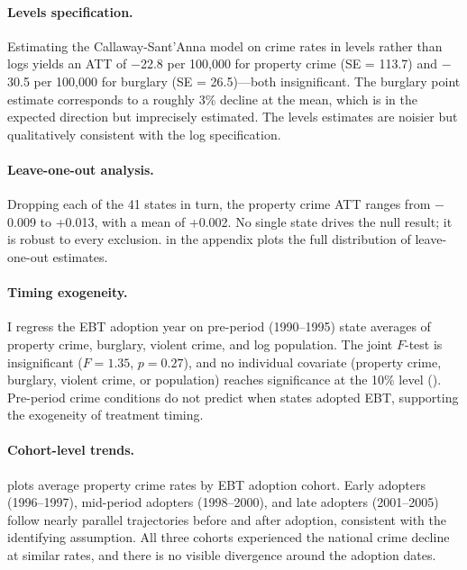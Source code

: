 \documentclass[12pt]{article}
\begin{document}
\paragraph{Levels specification.} Estimating the Callaway-Sant'Anna model on crime rates in levels rather than logs yields an ATT of $-$22.8 per 100,000 for property crime (SE = 113.7) and $-$30.5 per 100,000 for burglary (SE = 26.5)---both insignificant. The burglary point estimate corresponds to a roughly 3\% decline at the mean, which is in the expected direction but imprecisely estimated. The levels estimates are noisier but qualitatively consistent with the log specification.

\paragraph{Leave-one-out analysis.} Dropping each of the 41 states in turn, the property crime ATT ranges from $-$0.009 to +0.013, with a mean of +0.002. No single state drives the null result; it is robust to every exclusion.  in the appendix plots the full distribution of leave-one-out estimates.

\paragraph{Timing exogeneity.} I regress the EBT adoption year on pre-period (1990--1995) state averages of property crime, burglary, violent crime, and log population. The joint $F$-test is insignificant ($F = 1.35$, $p = 0.27$), and no individual covariate (property crime, burglary, violent crime, or population) reaches significance at the 10\% level (). Pre-period crime conditions do not predict when states adopted EBT, supporting the exogeneity of treatment timing.



\paragraph{Cohort-level trends.}  plots average property crime rates by EBT adoption cohort. Early adopters (1996--1997), mid-period adopters (1998--2000), and late adopters (2001--2005) follow nearly parallel trajectories before and after adoption, consistent with the identifying assumption. All three cohorts experienced the national crime decline at similar rates, and there is no visible divergence around the adoption dates.
\end{document}
